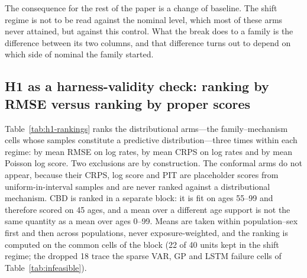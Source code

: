 The consequence for the rest of the paper is a change of baseline. The
shift regime is not to be read against the nominal level, which most of
these arms never attained, but against this control. What the break does
to a family is the difference between its two columns, and that difference
turns out to depend on which side of nominal the family started.

\subsection{H1 as a harness-validity check: ranking by RMSE versus ranking by proper scores}


Table~\ref{tab:h1-rankings} ranks the distributional arms---the
family--mechanism cells whose samples constitute a predictive
distribution---three times within each regime: by mean RMSE on log rates,
by mean CRPS on log rates and by mean Poisson log score. Two exclusions
are by construction. The conformal arms do not appear, because their CRPS,
log score and PIT are placeholder scores from uniform-in-interval samples
and are never ranked against a distributional mechanism. CBD is ranked in
a separate block: it is fit on ages 55--99 and therefore scored on 45
ages, and a mean over a different age support is not the same quantity as
a mean over ages 0--99. Means are taken within population--sex first and
then across populations, never exposure-weighted, and the ranking is
computed on the common cells of the block (22 of 40 units kept in the
shift regime; the dropped 18 trace the sparse VAR, GP and LSTM failure
cells of Table~\ref{tab:infeasible}).

